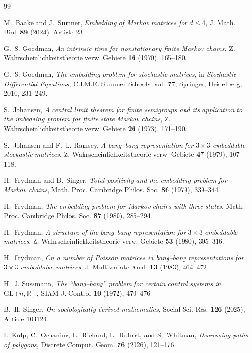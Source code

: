 \documentclass[11pt,onecolumn]{amsart}
\theoremstyle{plain}
\theoremstyle{definition}
\theoremstyle{remark}
\begin{document}
\begin{thebibliography}{99}

M.~Baake and J.~Sumner,
\emph{Embedding of Markov matrices for $d\leq 4$},
J. Math. Biol. \textbf{89} (2024), Article 23.

G.~S. Goodman,
\emph{An intrinsic time for nonstationary finite Markov chains},
Z. Wahrscheinlichkeitstheorie verw. Gebiete \textbf{16} (1970), 165--180.

G.~S. Goodman,
\emph{The embedding problem for stochastic matrices},
in \emph{Stochastic Differential Equations},
C.I.M.E. Summer Schools, vol.~77,
Springer, Heidelberg, 2010, 231--249.

S.~Johansen,
\emph{A central limit theorem for finite semigroups and its application
	to the imbedding problem for finite state Markov chains},
Z. Wahrscheinlichkeitstheorie verw. Gebiete
\textbf{26} (1973), 171--190.


S.~Johansen and F.~L. Ramsey,
\emph{A bang--bang representation for $3\times3$ embeddable stochastic matrices},
Z. Wahrscheinlichkeitstheorie verw. Gebiete \textbf{47} (1979), 107--118.

H.~Frydman and B.~Singer,
\emph{Total positivity and the embedding problem for Markov chains},
Math. Proc. Cambridge Philos. Soc. \textbf{86} (1979), 339--344.

H.~Frydman,
\emph{The embedding problem for Markov chains with three states},
Math. Proc. Cambridge Philos. Soc. \textbf{87} (1980), 285--294.

H.~Frydman,
\emph{A structure of the bang--bang representation for $3\times3$ embeddable matrices},
Z. Wahrscheinlichkeitstheorie verw. Gebiete \textbf{53} (1980), 305--316.

H.~Frydman,
\emph{On a number of Poisson matrices in bang--bang representations for
$3\times3$ embeddable matrices},
J. Multivariate Anal. \textbf{13} (1983), 464--472.

H.~J. Sussmann,
\emph{The ``bang--bang'' problem for certain control systems in
$\mathrm{GL}(n,\mathbb R)$},
SIAM J. Control \textbf{10} (1972), 470--476.

B.~H. Singer,
\emph{On sociologically derived mathematics},
Social Sci. Res. \textbf{126} (2025), Article 103124.

I.~Kulp, C.~Ochanine, L.~Richard, L.~Robert, and S.~Whitman,
\emph{Decreasing paths of polygons},
Discrete Comput. Geom. \textbf{76} (2026), 121--176.

\end{thebibliography}
\end{document}
